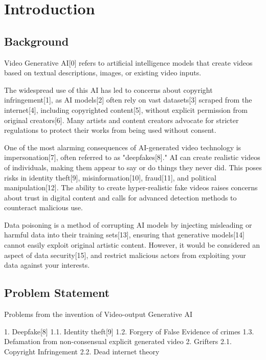\chapter{Introduction}
\label{chap:introduction}

\section{Background}
\label{section:background}

Video Generative AI[0] refers to artificial intelligence models that create videos based on textual descriptions, images, or existing video inputs. 

The widespread use of this AI has led to concerns about copyright infringement[1], as AI models[2] often rely on vast datasets[3] scraped from the internet[4], including copyrighted content[5], without explicit permission from original creators[6]. Many artists and content creators advocate for stricter regulations to protect their works from being used without consent.

One of the most alarming consequences of AI-generated video technology is impersonation[7], often referred to as "deepfakes[8]." AI can create realistic videos of individuals, making them appear to say or do things they never did. This poses risks in identity theft[9], misinformation[10], fraud[11], and political manipulation[12]. The ability to create hyper-realistic fake videos raises concerns about trust in digital content and calls for advanced detection methods to counteract malicious use.

Data poisoning is a method of corrupting AI models by injecting misleading or harmful data into their training sets[13], ensuring that generative models[14] cannot easily exploit original artistic content. However, it would be considered an aspect of data security[15], and restrict malicious actors from exploiting your data against your interests.

\section{Problem Statement}
\label{section:problem-statement}

Problems from the invention of Video-output Generative AI

1. Deepfake[8]
    1.1. Identity theft[9]
    1.2. Forgery of False Evidence of crimes
    1.3. Defamation from non-consensual explicit generated video
2. Grifters
    2.1. Copyright Infringement
    2.2. Dead internet theory 

